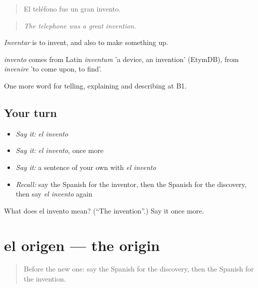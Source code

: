 \begin{quote}
El teléfono fue un gran invento.
\end{quote}

\begin{quote}
\emph{The telephone was a great invention.}
\end{quote}

\emph{Inventar} is to invent, and also to make something up.

\begin{cousinweb}
\emph{invento} comes from Latin \emph{inventum} 'a device, an invention' (EtymDB), from \emph{invenīre} 'to come upon, to find'.
\end{cousinweb}

\begin{grammarlens}[title={What you've built}]
One more word for telling, explaining and describing at B1.
\end{grammarlens}

\subsection*{Your turn}
\begin{itemize}
\raggedright
  \item \emph{Say it:} \emph{el invento}
  \item \emph{Say it:} \emph{el invento}, once more
  \item \emph{Say it:} a sentence of your own with \emph{el invento}
  \item \emph{Recall:} say the Spanish for the inventor, then the Spanish for the discovery, then say \emph{el invento} again
\end{itemize}

\begin{tcolorbox}[breakable,colback=teal!4,colframe=teal!35!black,title={Before you move on}]
What does el invento mean? (\textquotedblleft{}The invention\textquotedblright{}.) Say it once more.
\end{tcolorbox}
\section[el origen]{el origen — the origin}

\label{lesson:ES-C571-origen}



\begin{quote}
Before the new one: say the Spanish for the discovery, then the Spanish for the invention.
\end{quote}

